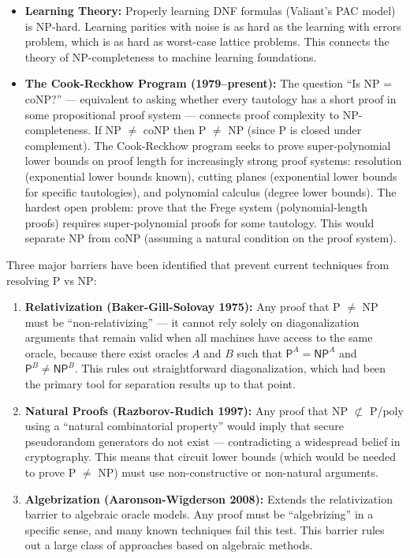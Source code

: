 \begin{itemize}
\item \textbf{Learning Theory:} Properly learning DNF formulas (Valiant's PAC model) is NP-hard. Learning parities with noise is as hard as the learning with errors problem, which is as hard as worst-case lattice problems. This connects the theory of NP-completeness to machine learning foundations.

\item \textbf{The Cook-Reckhow Program (1979--present):} The question ``Is NP = coNP?'' — equivalent to asking whether every tautology has a short proof in some propositional proof system — connects proof complexity to NP-completeness. If NP $\neq$ coNP then P $\neq$ NP (since P is closed under complement). The Cook-Reckhow program seeks to prove super-polynomial lower bounds on proof length for increasingly strong proof systems: resolution (exponential lower bounds known), cutting planes (exponential lower bounds for specific tautologies), and polynomial calculus (degree lower bounds). The hardest open problem: prove that the Frege system (polynomial-length proofs) requires super-polynomial proofs for some tautology. This would separate NP from coNP (assuming a natural condition on the proof system).
\end{itemize}

Three major barriers have been identified that prevent current techniques from resolving P vs NP:

\begin{enumerate}
\item \textbf{Relativization (Baker-Gill-Solovay 1975):} Any proof that P $\neq$ NP must be ``non-relativizing'' — it cannot rely solely on diagonalization arguments that remain valid when all machines have access to the same oracle, because there exist oracles $A$ and $B$ such that $\mathsf{P}^A = \mathsf{NP}^A$ and $\mathsf{P}^B \neq \mathsf{NP}^B$. This rules out straightforward diagonalization, which had been the primary tool for separation results up to that point.

\item \textbf{Natural Proofs (Razborov-Rudich 1997):} Any proof that NP $\not\subset$ P/poly using a ``natural combinatorial property'' would imply that secure pseudorandom generators do not exist — contradicting a widespread belief in cryptography. This means that circuit lower bounds (which would be needed to prove P $\neq$ NP) must use non-constructive or non-natural arguments.

\item \textbf{Algebrization (Aaronson-Wigderson 2008):} Extends the relativization barrier to algebraic oracle models. Any proof must be ``algebrizing'' in a specific sense, and many known techniques fail this test. This barrier rules out a large class of approaches based on algebraic methods.
\end{enumerate}

